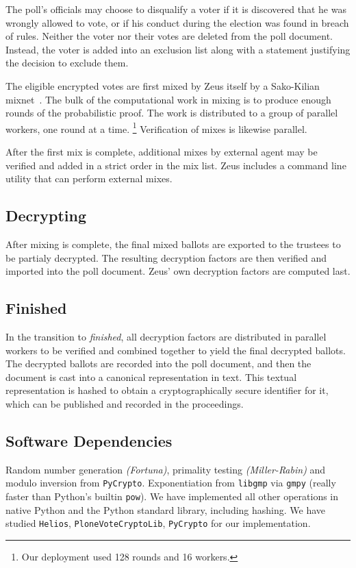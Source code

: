 \documentclass[letterpaper,10pt]{article}
\begin{document}
The poll's officials may choose to disqualify a voter if
it is discovered that he was wrongly allowed to vote, or if
his conduct during the election was found in breach of rules.
Neither the voter nor their votes are deleted from the poll document.
Instead, the voter is added into an exclusion list along with
a statement justifying the decision to exclude them.

The eligible encrypted votes are first mixed by Zeus itself
by a Sako-Kilian mixnet~\cite{sako:1995}.
The bulk of the computational work in mixing is to produce
enough rounds of the probabilistic proof.
The work is distributed to a group of parallel workers,
one round at a time.
\footnote{Our deployment used 128 rounds and 16 workers.}
Verification of mixes is likewise parallel.

After the first mix is complete, additional mixes by external agent
may be verified and added in a strict order in the mix list.
Zeus includes a command line utility that can perform external mixes.

\subsection{Decrypting}
\label{decrypting}

After mixing is complete, the final mixed ballots are exported to
the trustees to be partialy decrypted.
The resulting decryption factors are then verified and imported
into the poll document.
Zeus' own decryption factors are computed last.

\subsection{Finished}
\label{finished}
In the transition to \emph{finished}, all decryption factors are
distributed in parallel workers to be verified and combined together
to yield the final decrypted ballots.
The decrypted ballots are recorded into the poll document,
and then the document is cast into a canonical representation in text.
This textual representation is hashed to obtain a cryptographically
secure identifier for it, which can be published and recorded
in the proceedings.


\subsection{Software Dependencies}
Random number generation \emph{(Fortuna)}, primality testing
\emph{(Miller-Rabin)} and modulo inversion from \texttt{PyCrypto}.
Exponentiation from \texttt{libgmp} via \texttt{gmpy} (really faster
than Python's builtin \texttt{pow}). We have implemented all other
operations in native Python and the Python standard library, including
hashing. We have studied \texttt{Helios}, \texttt{PloneVoteCryptoLib},
\texttt{PyCrypto} for our implementation.
\end{document}
